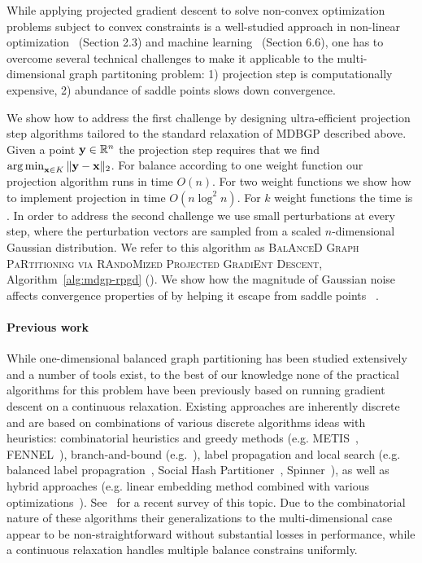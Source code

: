 While applying projected gradient descent to solve non-convex optimization problems subject to convex constraints is a well-studied approach in non-linear optimization~\cite{B99} (Section 2.3) and machine learning~\cite{JK17} (Section 6.6), one has to overcome several technical challenges to make it applicable to the multi-dimensional graph partitoning problem: 1) projection step is computationally expensive, 2) abundance of saddle points slows down convergence.

We show how to address the first challenge by designing ultra-efficient projection step algorithms tailored to the standard relaxation of MDBGP described above. Given a point $\mathbf y \in \mathbb R^n$ the projection step requires that we find $\operatorname*{arg\,min}_{\mathbf x \in K} \|\mathbf y - \mathbf x\|_2$. 
 For balance according to one weight function our projection algorithm runs in time $O(n)$. For two weight functions we show how to implement projection in time $O(n \log^2 n)$. For $k$ weight functions the time is . In order to address the second challenge we use small perturbations at every step, where the perturbation vectors are sampled from a scaled $n$-dimensional Gaussian distribution.  We refer to this algorithm as \textsc{BalAnceD Graph PaRtitioning via RAndoMized Projected GradiEnt Descent}, Algorithm~\ref{alg:mdgp-rpgd} (\algname).
We show how the magnitude of Gaussian noise affects convergence properties of \algname by helping it escape from saddle points~\cite{} .



\paragraph{Previous work}

While one-dimensional balanced graph partitioning has been studied extensively and a number of tools exist, to the best of our knowledge none of the practical algorithms for this problem have been previously based on running gradient descent on a continuous relaxation.
Existing approaches are inherently discrete and are based on combinations of various discrete algorithms ideas with heuristics: combinatorial heuristics and greedy methods (e.g. METIS~\cite{KK95}, FENNEL~\cite{TGRV14}), branch-and-bound (e.g.~\cite{DGRW12}), label propagation and local search (e.g. balanced label propagration~\cite{UB13}, Social Hash Partitioner~\cite{KKPPSAP17}, Spinner~\cite{MLLS17}), as well as hybrid approaches (e.g. linear embedding method combined with various optimizations~\cite{ABM16}). See~\cite{BMSSS16} for a recent survey of this topic. Due to the combinatorial nature of these algorithms their generalizations to the multi-dimensional case appear to be non-straightforward without substantial losses in performance, while a continuous relaxation handles multiple balance constrains uniformly.

